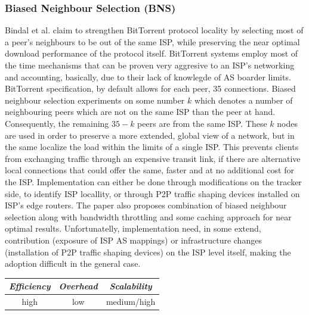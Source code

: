 \subsubsection{Biased Neighbour Selection (BNS)}
Bindal et al. \cite{rpc_bitbiased_2006} claim to strengthen BitTorrent
protocol\cite{c_bittorrent_2003} locality by selecting most of a peer's
neighbours to be out of the same ISP, while preserving the near optimal download
performance of the protocol itself. BitTorrent systems employ most of the time
mechanisms that can be proven very aggresive to an ISP's networking and
accounting, basically, due to their lack of knowlegde of AS boarder limits.
BitTorrent specification, by default allows for each peer, 35 connections.
Biased neighbour selection experiments on some number $k$ which denotes a number
of neighbouring peers which are not on the same ISP than the peer at hand.
Consequently, the remaining $35 - k$ peers are from the same ISP. These $k$
nodes are used in order to preserve a more extended, global view of a network,
but in the same localize the load within the limits of a single ISP. This
prevents clients from exchanging traffic through an expensive transit link, if
there are alternative local connections that could offer the same, faster and at
no additional cost for the ISP. Implementation can either be done through
modifications on the tracker side, to identify ISP locallity, or through P2P
traffic shaping devices installed on ISP's edge routers. The paper also proposes
combination of biased neighbour selection along with bandwidth throttling and
some caching approach for near optimal results. Unfortunatelly, implementation
need, in some extend, contribution (exposure of ISP AS mappings) or
infrastructure changes (installation of P2P traffic shaping devices) on the ISP
level itself, making the adoption difficult in the general case.

\begin{center}
\begin{tabular}{ccc}
\emph{Efficiency} & \emph{Overhead} & \emph{Scalability} \\
\hline
high &
low &
medium/high
\end{tabular}
\end{center}

